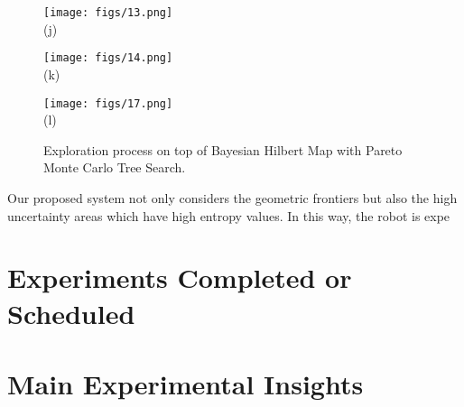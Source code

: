 \begin{figure}[htbp]
\begin{minipage}[tb]{0.33\linewidth}
        \label{fig:exploration_7}
    \end{minipage}
    \begin{minipage}[tb]{0.33\linewidth}
        \centering
        \texttt{[image: figs/13.png]}\\(j)
        \label{fig:exploration_8}
    \end{minipage}
    \begin{minipage}[tb]{0.33\linewidth}
        \centering
        \texttt{[image: figs/14.png]}\\(k)
        \label{fig:exploration_9}
    \end{minipage}
    \begin{minipage}[tb]{0.33\linewidth}
        \centering
        \texttt{[image: figs/17.png]}\\(l)
        \label{fig:exploration_11}
    \end{minipage}
    \caption{\small
         Exploration process on top of Bayesian Hilbert Map with Pareto Monte Carlo Tree Search.
    }
    \label{fig:exploration}
\end{figure}

Our proposed system not only considers the geometric frontiers but also the high uncertainty areas which have high entropy values. In this way, the robot is expe
\section{Experiments Completed or Scheduled}
\section{Main Experimental Insights}


